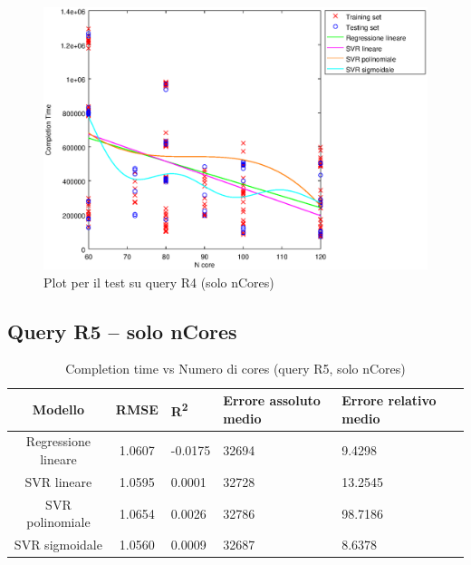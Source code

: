 \documentclass[a4paper,11pt]{article}
\begin{document}
\begin {figure}[hbtp]
\centering
\includegraphics[width=\textwidth]{output/R4_SOLO_CORE_FILTER_1500000/plot_R4_-.eps}
\caption {Plot per il test su query R4 
(solo nCores)}
\end {figure}

\newpage
\subsection{Query R5 -- solo nCores}
\begin{table}[bhpt]
	\centering
	\begin{adjustbox}{center}
		\begin{tabular}{c | c M{1.2cm} M{2.5cm} M{2.5cm} M{1.8cm}}
			Modello & RMSE & R\textsuperscript{2} & Errore assoluto medio & Errore relativo medio \tabularnewline
			\hline
			Regressione lineare & 1.0607 & -0.0175 &  32694 & 9.4298 \\
			SVR lineare & 1.0595 & 0.0001 &  32728 & 13.2545 \\
			SVR polinomiale & 1.0654 & 0.0026 &  32786 & 98.7186 \\
			SVR sigmoidale & 1.0560 & 0.0009 &  32687 & 8.6378 \\
		\end{tabular}
	\end{adjustbox}
	\\
	\caption{Completion time vs Numero di cores (query R5, solo nCores)}
	\label{table_R5_nCores}
\end{table}
\end{document}
